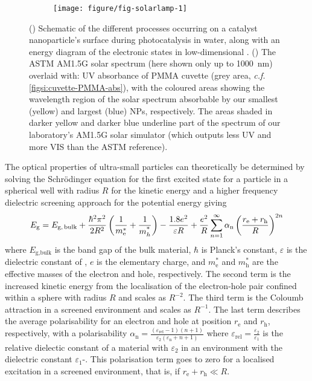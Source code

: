 \documentclass[9pt,twoside,twocolumn]{article}\usepackage{knitr}
\begin{document}
\begin{refsection}
\begin{figure}[tb]
\begin{subfigure}[b]{\linewidth}
\begin{knitrout}
{\centering \texttt{[image: figure/fig-solarlamp-1]} 

}


\end{knitrout}
\end{subfigure}
\caption{() Schematic of the different processes occurring on a catalyst nanoparticle's surface during photocatalysis in water, along with an energy diagram of the electronic states in low-dimensional .
() The ASTM AM1.5G solar spectrum (here shown only up to \qty{1000}{\nm}) overlaid with: UV absorbance of PMMA cuvette (grey area, \textit{c.f.} \cref{figsi:cuvette-PMMA-abs}), with the coloured areas showing the wavelength region of the solar spectrum absorbable by our smallest (yellow) and largest (blue)  NPs, respectively.
The areas shaded in darker yellow and darker blue underline part of the spectrum of our laboratory's AM1.5G solar simulator (which outputs less UV and more VIS than the ASTM reference).}
\label{fig:schematic-and-solarlamp}
\end{figure}


The optical properties of ultra-small  particles can theoretically be determined by solving the Schrödinger equation for the first excited state for a particle in a spherical well with radius $R$ for the kinetic energy and a higher frequency dielectric screening approach for the potential energy giving \cite{Brus1984,Jacobsson2011,Edvinsson2018}
\begin{equation}
E_\text{g} = %
E_\text{g,\,bulk} +
\frac{\hbar^{2}\pi^{2}}{2R^2} \left(\frac{1}{m_\text{e}^{*}} + \frac{1}{m_{h}^\text{*}}\right) %
- \frac{1.8e^2}{\varepsilon R} +
\frac{e^2}{R}\sum_{n=1}^{\infty} \alpha_\text{n} \left(\frac{r_\text{e} + r_\text{h}}{R}\right)^{2n}
\end{equation}
where $E_\text{g,bulk}$ is the band gap of the bulk material, $\hbar$ is Planck's constant, $\varepsilon$ is the dielectric constant of , $e$ is the elementary charge, and $m_\text{e}^{*}$ and $m_\text{h}^{*}$ are the effective masses of the electron and hole, respectively.
The second term is the increased kinetic energy from the localisation of the electron-hole pair confined within a sphere with radius $R$ and scales as $R^{-2}$.
The third term is the Coloumb attraction in a screened environment and scales as $R^{-1}$.
The last term describes the average polarisability for an electron and hole at position $r_\text{e}$ and $r_\text{h}$, respectively, with a polarisability $\alpha_\text{n} = \frac{(\varepsilon_\text{rel} - 1)(n + 1)}{\varepsilon_2(\varepsilon_\text{n} + n + 1)}$ where $\varepsilon_\text{rel} = \frac{\varepsilon_2}{\varepsilon_1}$ is the relative dielectic constant of a material with $\varepsilon_2$ in an environment with the dielectric constant $\varepsilon_1$-.
This polarisation term goes to zero for a localised excitation in a screened environment, that is, if $r_\text{e} + r_\text{h} \ll R$. \cite{Brus1984}


\end{refsection}
\end{document}
